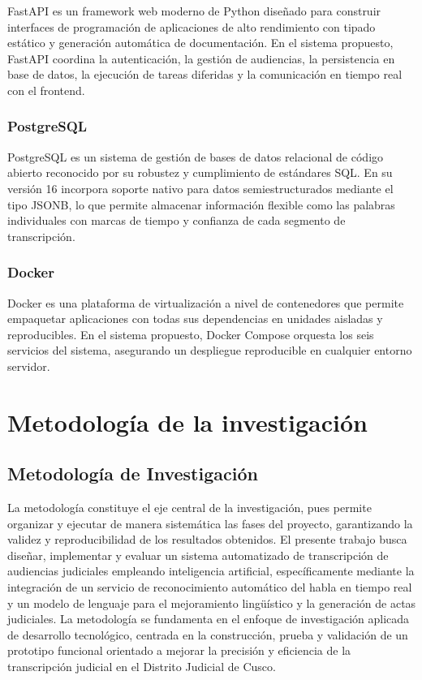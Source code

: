 \documentclass[12pt,a4paper,oneside]{article}
\begin{document}
FastAPI es un framework web moderno de Python dise\~nado para construir interfaces de programaci\'on de aplicaciones de alto rendimiento con tipado est\'atico y generaci\'on autom\'atica de documentaci\'on. En el sistema propuesto, FastAPI coordina la autenticaci\'on, la gesti\'on de audiencias, la persistencia en base de datos, la ejecuci\'on de tareas diferidas y la comunicaci\'on en tiempo real con el frontend.

\subsubsection{PostgreSQL}

PostgreSQL es un sistema de gesti\'on de bases de datos relacional de c\'odigo abierto reconocido por su robustez y cumplimiento de est\'andares SQL. En su versi\'on 16 incorpora soporte nativo para datos semiestructurados mediante el tipo JSONB, lo que permite almacenar informaci\'on flexible como las palabras individuales con marcas de tiempo y confianza de cada segmento de transcripci\'on.

\subsubsection{Docker}

Docker es una plataforma de virtualizaci\'on a nivel de contenedores que permite empaquetar aplicaciones con todas sus dependencias en unidades aisladas y reproducibles. En el sistema propuesto, Docker Compose orquesta los seis servicios del sistema, asegurando un despliegue reproducible en cualquier entorno servidor.


\section{Metodolog\'ia de la investigaci\'on}

\subsection{Metodolog\'ia de Investigaci\'on}

La metodolog\'ia constituye el eje central de la investigaci\'on, pues permite organizar y ejecutar de manera sistem\'atica las fases del proyecto, garantizando la validez y reproducibilidad de los resultados obtenidos. El presente trabajo busca dise\~nar, implementar y evaluar un sistema automatizado de transcripci\'on de audiencias judiciales empleando inteligencia artificial, espec\'ificamente mediante la integraci\'on de un servicio de reconocimiento autom\'atico del habla en tiempo real y un modelo de lenguaje para el mejoramiento ling\"u\'istico y la generaci\'on de actas judiciales. La metodolog\'ia se fundamenta en el enfoque de investigaci\'on aplicada de desarrollo tecnol\'ogico, centrada en la construcci\'on, prueba y validaci\'on de un prototipo funcional orientado a mejorar la precisi\'on y eficiencia de la transcripci\'on judicial en el Distrito Judicial de Cusco.
\end{document}

